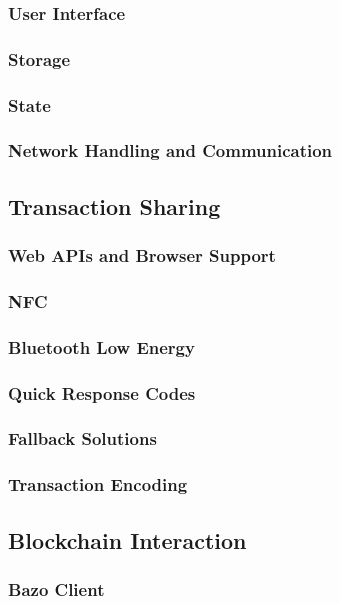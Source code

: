 \documentclass[a4paper]{article}
\begin{document}
\subsubsection{User Interface}
\subsubsection{Storage}
\subsubsection{State}
\subsubsection{Network Handling and Communication}

\subsection{Transaction Sharing}
\subsubsection{Web APIs and Browser Support}
\subsubsection{NFC}

\subsubsection{Bluetooth Low Energy}
\subsubsection{Quick Response Codes}
\subsubsection{Fallback Solutions}
\subsubsection{Transaction Encoding}

\subsection{Blockchain Interaction}
\subsubsection{Bazo Client}
\end{document}
